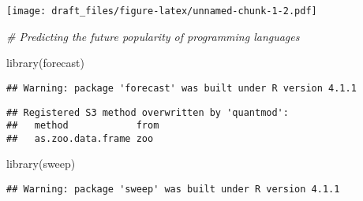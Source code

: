 \documentclass[
]{article}
\newenvironment{Shaded}{\begin{snugshade}}{\end{snugshade}}
\newcommand{\CommentTok}[1]{\textcolor[rgb]{0.56,0.35,0.01}{\textit{#1}}}
\newcommand{\FunctionTok}[1]{\textcolor[rgb]{0.00,0.00,0.00}{#1}}
\newcommand{\NormalTok}[1]{#1}
\begin{document}
\texttt{[image: draft\_files/figure-latex/unnamed-chunk-1-2.pdf]}

\begin{Shaded}
\begin{Highlighting}[]
\CommentTok{\# Predicting the future popularity of programming languages}


\FunctionTok{library}\NormalTok{(forecast)}
\end{Highlighting}
\end{Shaded}

\begin{verbatim}
## Warning: package 'forecast' was built under R version 4.1.1
\end{verbatim}

\begin{verbatim}
## Registered S3 method overwritten by 'quantmod':
##   method            from
##   as.zoo.data.frame zoo
\end{verbatim}

\begin{Shaded}
\begin{Highlighting}[]
\FunctionTok{library}\NormalTok{(sweep)}
\end{Highlighting}
\end{Shaded}

\begin{verbatim}
## Warning: package 'sweep' was built under R version 4.1.1
\end{verbatim}
\end{document}
